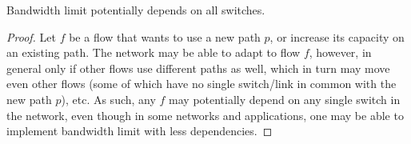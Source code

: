 \begin{lemma}\label{lemma:imp bandwidth limit} Bandwidth limit potentially depends on all switches.
\end{lemma}

\begin{proof} Let $f$ be a flow that wants to use a new path $p$, or increase its capacity on an existing path. The network may be able to adapt to flow $f$, however, in general only if other flows use different paths as well, which in turn may move even other flows (some of which have no single switch/link in common with the new path $p$), etc. As such, any $f$ may potentially depend on any single switch in the network, even though in some networks and applications, one may be able to implement bandwidth limit with less dependencies.
\end{proof}

